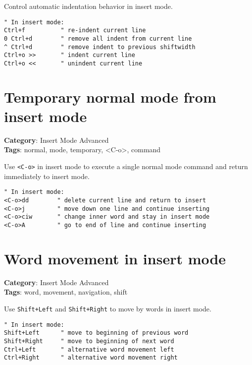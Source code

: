 {{{{{{Control automatic indentation behavior in insert mode.

\begin{Exa*}{}
\begin{Verbatim}[fontsize=\footnotesize, breaklines, breakanywhere]
" In insert mode:
Ctrl+f          " re-indent current line
0 Ctrl+d        " remove all indent from current line
^ Ctrl+d        " remove indent to previous shiftwidth
Ctrl+o >>       " indent current line
Ctrl+o <<       " unindent current line
\end{Verbatim}
\end{Exa*}

\section{Temporary normal mode from insert mode}

\textbf{Category}: Insert Mode Advanced\\ \textbf{Tags}: normal, mode, temporary, <C-o>, command
\vspace{0.5cm}

Use {\footnotesize \Verb§<C-o>§} in insert mode to execute a single normal mode command and return immediately to insert mode.

\begin{Exa*}{}
\begin{Verbatim}[fontsize=\footnotesize, breaklines, breakanywhere]
" In insert mode:
<C-o>dd        " delete current line and return to insert
<C-o>j         " move down one line and continue inserting
<C-o>ciw       " change inner word and stay in insert mode
<C-o>A         " go to end of line and continue inserting
\end{Verbatim}
\end{Exa*}

\section{Word movement in insert mode}

\textbf{Category}: Insert Mode Advanced\\ \textbf{Tags}: word, movement, navigation, shift
\vspace{0.5cm}

Use {\footnotesize \Verb§Shift+Left§} and {\footnotesize \Verb§Shift+Right§} to move by words in insert mode.

\begin{Exa*}{}
\begin{Verbatim}[fontsize=\footnotesize, breaklines, breakanywhere]
" In insert mode:
Shift+Left      " move to beginning of previous word
Shift+Right     " move to beginning of next word
Ctrl+Left       " alternative word movement left
Ctrl+Right      " alternative word movement right
\end{Verbatim}
\end{Exa*}

}}}}}}
